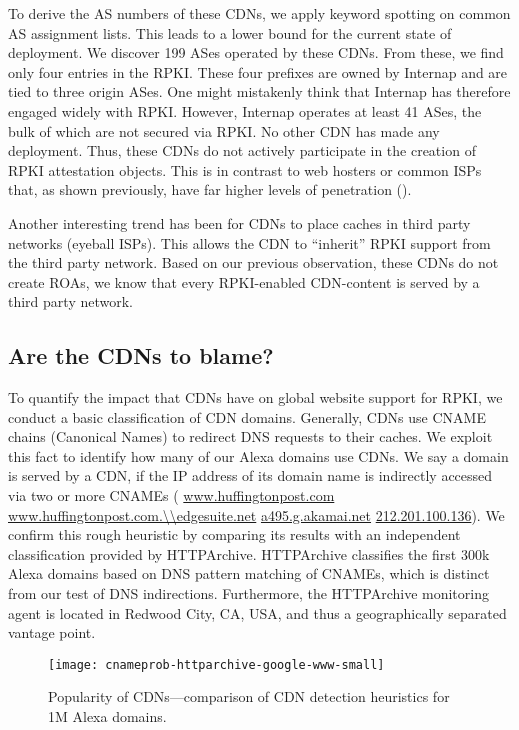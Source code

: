 To derive the AS numbers of these CDNs, we apply keyword spotting on common AS assignment lists.
This leads to a lower bound for the current state of deployment.
We discover 199 ASes operated by these CDNs.
From these, we find only four entries in the RPKI.
These four prefixes are owned by Internap and are tied to three origin ASes. One might mistakenly think that Internap has therefore engaged widely with RPKI. However, Internap operates at least 41 ASes, the bulk of which are not secured via RPKI. No other CDN has made any deployment. Thus, these CDNs do not actively participate in the creation of RPKI attestation objects. This is in contrast to web hosters or common ISPs that, as shown previously, have far higher levels of penetration ().




Another interesting trend has been for CDNs to place caches in third party networks (\eg eyeball ISPs).
This allows the CDN to ``inherit'' RPKI support from the third party network.
Based on our previous observation, \ie these CDNs do not create ROAs, we know that every RPKI-enabled CDN-content is served by a third party network.





\subsection{Are the CDNs to blame?}

To quantify the impact that CDNs have on global website support for RPKI, we conduct a basic classification of CDN domains.
Generally, CDNs use CNAME chains (Canonical Names) to redirect DNS requests to
their caches. We exploit this fact to identify how many of our Alexa domains use CDNs.
We say a domain is served by a CDN, if the IP address
of its domain name is indirectly accessed via two or more CNAMEs (\eg
\url{www.huffingtonpost.com} 
\url{www.huffingtonpost.com.\\edgesuite.net} 
\url{a495.g.akamai.net}  \url{212.201.100.136}).
We confirm this rough heuristic by comparing its results with an independent
classification provided by HTTP\-Archive. HTTP\-Archive classifies the first
300k Alexa domains based on DNS pattern matching of CNAMEs, which is distinct from our test of DNS indirections. Furthermore, the HTTPArchive monitoring agent is located in Redwood City, CA, USA, and thus a geographically separated vantage point.

\begin{figure}
  \texttt{[image: cnameprob-httparchive-google-www-small]}
  \caption{Popularity of CDNs---comparison of CDN detection heuristics for 1M Alexa domains.}
  \label{fig:cnameprob-httparchive-google-www}
\end{figure}

